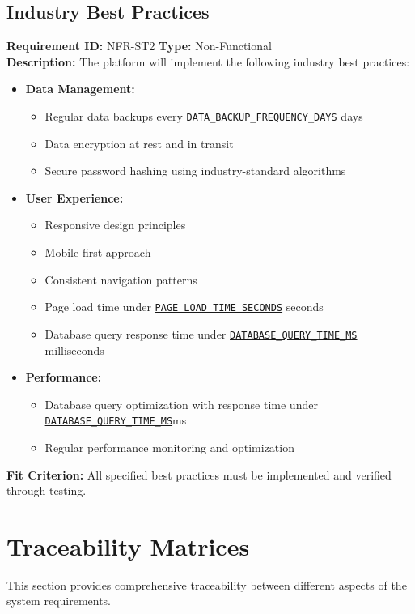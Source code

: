 \documentclass[12pt, titlepage]{article}
\begin{document}
\subsection{Industry Best Practices}
\textbf{Requirement ID:} NFR-ST2 \quad \textbf{Type:} Non-Functional \\
\textbf{Description:} The platform will implement the following industry best practices:
\begin{itemize}
    \item \textbf{Data Management:}
    \begin{itemize}
        \item Regular data backups every \hyperref[DATA_BACKUP_FREQUENCY_DAYS]{\texttt{DATA\_BACKUP\_FREQUENCY\_DAYS}} days
        \item Data encryption at rest and in transit
        \item Secure password hashing using industry-standard algorithms
    \end{itemize}

    \item \textbf{User Experience:}
    \begin{itemize}
        \item Responsive design principles
        \item Mobile-first approach
        \item Consistent navigation patterns
        \item Page load time under \hyperref[PAGE_LOAD_TIME_SECONDS]{\texttt{PAGE\_LOAD\_TIME\_SECONDS}} seconds
        \item Database query response time under \hyperref[DATABASE_QUERY_TIME_MS]{\texttt{DATABASE\_QUERY\_TIME\_MS}} milliseconds
    \end{itemize}

    \item \textbf{Performance:}
    \begin{itemize}
        \item Database query optimization with response time under \hyperref[DATABASE_QUERY_TIME_MS]{\texttt{DATABASE\_QUERY\_TIME\_MS}}ms
        \item Regular performance monitoring and optimization
    \end{itemize}
\end{itemize}
\textbf{Fit Criterion:} All specified best practices must be implemented and verified through testing.

\section{Traceability Matrices}
This section provides comprehensive traceability between different aspects of the system requirements.
\end{document}
